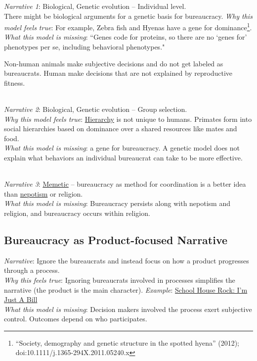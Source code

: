\textit{Narrative 1}: Biological, Genetic evolution -- Individual level. \\
There might be biological arguments for a genetic basis for bureaucracy. 
\textit{Why this model feels true}: For example, Zebra fish and Hyenas have a gene for dominance\footnote{``Society, demography and genetic structure in the spotted hyena'' (2012); doi:10.1111/j.1365-294X.2011.05240.x}. \\
\textit{What this model is missing}: ``Genes code for proteins, so there are no `genes for' phenotypes per se, including behavioral phenotypes."~\cite{2015_Lilienfeld}

Non-human animals make subjective decisions and do not get labeled as bureaucrats. Human make decisions that are not explained by reproductive fitness.

\ \\
\textit{Narrative 2}: Biological, Genetic evolution -- Group selection. \\
\textit{Why this model feels true}: \hyperref[sec:hierarchy-of-roles]{Hierarchy}
is not unique to humans. Primates form into social hierarchies based on dominance over a shared resources like mates and food. \\
\textit{What this model is missing}: a gene for bureaucracy. A genetic model does not explain what behaviors an individual bureaucrat can take to be more effective. 

\ \\
\textit{Narrative 3}: \href{https://en.wikipedia.org/wiki/Memetics}{Memetic}
-- bureaucracy as method for coordination is a better idea than \href{https://en.wikipedia.org/wiki/Nepotism}{nepotism} 
or religion. \\
\textit{What this model is missing}: Bureaucracy persists along with nepotism and religion, and bureaucracy occurs within religion. 

\subsection*{Bureaucracy as Product-focused Narrative}
\textit{Narrative}: Ignore the bureaucrats and instead focus on how a product progresses through a process.\\
\textit{Why this feels true}: Ignoring bureaucrats involved in processes simplifies the narrative (the product is the main character). 
\textit{Example}: \href{https://www.youtube.com/watch?v=OgVKvqTItto}{School House Rock: I'm Just A Bill}\\
\textit{What this model is missing}: Decision makers involved the process exert subjective control. Outcomes depend on who participates. 

